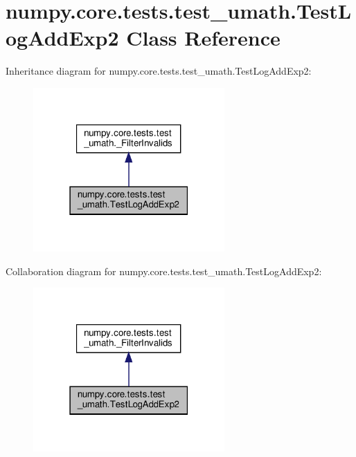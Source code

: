 \hypertarget{classnumpy_1_1core_1_1tests_1_1test__umath_1_1TestLogAddExp2}{}\section{numpy.\+core.\+tests.\+test\+\_\+umath.\+Test\+Log\+Add\+Exp2 Class Reference}
\label{classnumpy_1_1core_1_1tests_1_1test__umath_1_1TestLogAddExp2}


Inheritance diagram for numpy.\+core.\+tests.\+test\+\_\+umath.\+Test\+Log\+Add\+Exp2\+:
\nopagebreak
\begin{figure}[H]
\begin{center}
\leavevmode
\includegraphics[width=207pt]{classnumpy_1_1core_1_1tests_1_1test__umath_1_1TestLogAddExp2__inherit__graph}
\end{center}
\end{figure}


Collaboration diagram for numpy.\+core.\+tests.\+test\+\_\+umath.\+Test\+Log\+Add\+Exp2\+:
\nopagebreak
\begin{figure}[H]
\begin{center}
\leavevmode
\includegraphics[width=207pt]{classnumpy_1_1core_1_1tests_1_1test__umath_1_1TestLogAddExp2__coll__graph}
\end{center}
\end{figure}
